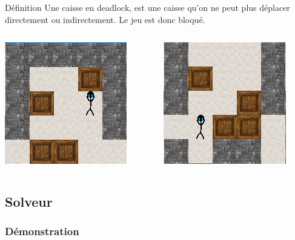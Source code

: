 \documentclass{beamer}
\begin{document}
\begin{frame}

\begin{block}{Définition}
Une caisse en deadlock, est une caisse qu'on ne peut plus déplacer directement ou indirectement. Le jeu est donc bloqué.
\end{block}
\vspace{0.5cm}
\begin{center}
\begin{columns}
\begin{column}{4cm}
\includegraphics[scale=0.7]{images/deadlock1.PNG}
\end{column}
\begin{column}{4cm}
\includegraphics[scale=0.7]{images/deadlock2.PNG}
\end{column}
\end{columns}
\end{center}
\end{frame}

\subsection{Solveur}
\begin{frame}
\frametitle{Démonstration}
\end{frame}
\end{document}
